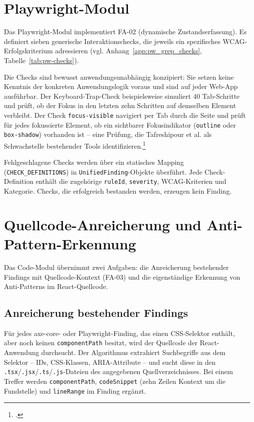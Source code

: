 \section{Playwright-Modul}
\label{sec:impl-pw}

Das Playwright-Modul implementiert \ac{FA}-02 (dynamische Zustandserfassung). Es definiert sieben generische Interaktionschecks, die jeweils ein spezifisches \ac{WCAG}-Erfolgskriterium adressieren (vgl. Anhang~\ref{app:pw_grep_checks}, Tabelle~\ref{tab:pw-checks}).

Die Checks sind bewusst anwendungsunabhängig konzipiert: Sie setzen keine Kenntnis der konkreten Anwendungslogik voraus und sind auf jeder Web-App ausführbar. Der Keyboard-Trap-Check beispielsweise simuliert 40 Tab-Schritte und prüft, ob der Fokus in den letzten zehn Schritten auf demselben Element verbleibt. Der Check \texttt{focus-visible} navigiert per Tab durch die Seite und prüft für jedes fokussierte Element, ob ein sichtbarer Fokusindikator (\texttt{outline} oder \texttt{box-shadow}) vorhanden ist -- eine Prüfung, die Tafreshipour et al. als Schwachstelle bestehender Tools identifizieren.\footcite[Vgl.][S.~110]{tafreshipour_ma11y_2024}

Fehlgeschlagene Checks werden über ein statisches Mapping (\texttt{CHECK\_DEFINITIONS}) in \texttt{UnifiedFinding}-Objekte überführt. Jede Check-Definition enthält die zugehörige \texttt{ruleId}, \texttt{severity}, \ac{WCAG}-Kriterien und Kategorie. Checks, die erfolgreich bestanden werden, erzeugen kein Finding.

\section{Quellcode-Anreicherung und Anti-Pattern-Erkennung}
\label{sec:impl-code}

Das Code-Modul übernimmt zwei Aufgaben: die Anreicherung bestehender Findings mit Quellcode-Kontext (\ac{FA}-03) und die eigenständige Erkennung von Anti-Patterns im React-Quellcode.

\subsection{Anreicherung bestehender Findings}

Für jedes axe-core- oder Playwright-Finding, das einen CSS-Selektor enthält, aber noch keinen \texttt{componentPath} besitzt, wird der Quellcode der React-Anwendung durchsucht. Der Algorithmus extrahiert Suchbegriffe aus dem Selektor -- IDs, CSS-Klassen, ARIA-Attribute -- und sucht diese in den \texttt{.tsx}/\texttt{.jsx}/\texttt{.ts}/\texttt{.js}-Dateien des angegebenen Quellverzeichnisses. Bei einem Treffer werden \texttt{componentPath}, \texttt{codeSnippet} (zehn Zeilen Kontext um die Fundstelle) und \texttt{lineRange} im Finding ergänzt.

